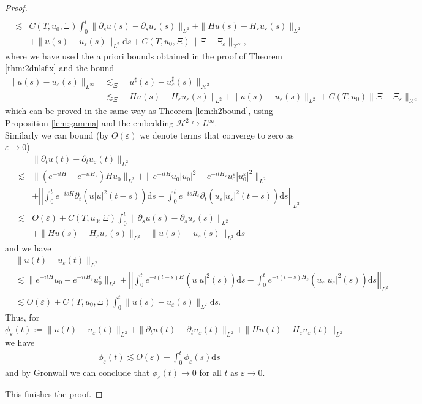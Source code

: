 \documentclass[11pt, oneside]{article}   	%
\newcommand{\mathd}{\mathrm{d}}
\newcommand{\ssp}{\mathscr{H}}
\begin{document}
\begin{proof}
\begin{align*}
\\\lesssim& C(T,u_0,\Xi)\int_{0}^{t}\|\partial_su(s)-\partial_su_\varepsilon(s)\|_{L^2}+\|Hu(s)-H_\varepsilon u_\varepsilon(s)\|_{L^2}\\&+\|u(s)- u_\varepsilon(s)\|_{L^2}\mathd s+C(T,u_0,\Xi)\|\Xi-\Xi_{\varepsilon}\|_{\mathscr{X}^\alpha},
\end{align*}
where we have used the a priori bounds obtained in the proof of Theorem \ref{thm:2dnlsfix} and the bound 
\begin{align*}
\|u(s)-u_\varepsilon(s)\|_{L^\infty} & \lesssim_\Xi \|u^\sharp(s)-u^\sharp_\varepsilon(s)\|_{\ssp^2} \\ &\lesssim_\Xi\|H u(s)-H_\varepsilon u_\varepsilon(s)\|_{L^2}+\|u(s)-u_\varepsilon(s)\|_{L^2}+C(T,u_0)\|\Xi-\Xi_{\varepsilon}\|_{\mathscr{X}^\alpha}
\end{align*}
which can be proved in the same way as Theorem \ref{lem:h2bound}, using Proposition \ref{lem:gamma} and the embedding $\ssp^2\hookrightarrow L^\infty.$\\
Similarly we can bound (by $O(\varepsilon)$ we denote terms that converge to zero as $\varepsilon\to0$)
\begin{align*}
& \|\partial_t u(t)-\partial_t u_\varepsilon(t)\|_{L^2}\\
\lesssim& \|(e^{-itH}-e^{-itH_\varepsilon})Hu_0\|_{L^2}+\|e^{-itH}u_0|u_0|^2-e^{-itH_\varepsilon}u^\varepsilon_0|u^\varepsilon_0|^2\|_{L^2}\\
&+\left| \left| \int_{0}^{t}e^{-isH}\partial_t(u|u|^2(t-s)) \mathd s-\int_{0}^{t}e^{-isH_\varepsilon}\partial_t(u_\varepsilon|u_\varepsilon|^2(t-s)) \mathd s\right| \right| _{L^2}\\
\lesssim& O(\varepsilon) +C(T,u_0,\Xi)\int_{0}^{t}\|\partial_su(s)-\partial_su_\varepsilon(s)\|_{L^2}\\ &+\|Hu(s)-H_\varepsilon u_\varepsilon(s)\|_{L^2}+\|u(s)- u_\varepsilon(s)\|_{L^2}\mathd s
\end{align*}
and we have
\begin{align*}
& \|u(t)-u_\varepsilon(t)\|_{L^2} \\
&\lesssim \|e^{-itH}u_0-e^{-itH_\varepsilon}u^\varepsilon_0\|_{L^2}+\left|\left|\int_{0}^{t}e^{-i(t-s)H}(u|u|^2(s)) \mathd s-\int_{0}^{t}e^{-i(t-s)H_\varepsilon}(u_\varepsilon|u_\varepsilon|^2(s)) \mathd s\right|\right|_{L^2}\\
&\lesssim O(\varepsilon) +C(T,u_0,\Xi)\int_{0}^{t}\|u(s)- u_\varepsilon(s)\|_{L^2}\mathd s.
\end{align*}
Thus, for $\phi_\varepsilon(t):= \|u(t)-u_\varepsilon(t)\|_{L^2}+\|\partial_tu(t)-\partial_tu_\varepsilon(t)\|_{L^2}+\|Hu(t)-H_\varepsilon u_\varepsilon(t)\|_{L^2}$ we have
\begin{align*}
\phi_\varepsilon(t)\lesssim O(\varepsilon)+\int_{0}^{t}\phi_\varepsilon(s)\mathd s
\end{align*}
and by Gronwall we can conclude that $\phi_\varepsilon(t)\to 0$ for all $t$ as $\varepsilon\to0.$

This finishes the proof.
\end{proof}
\end{document}
